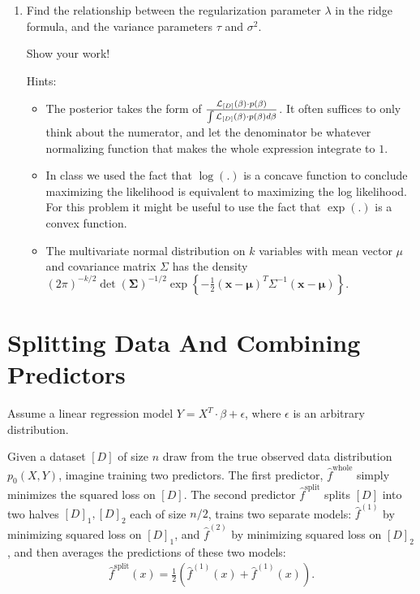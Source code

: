 \documentclass[11pt]{article}
\renewcommand{\vec}[1]{\mathbf{#1}}
\begin{document}
\begin{enumerate}
\begin{answertext}{16cm}{}
\end{answertext} 

\item Find the relationship between the regularization parameter $\lambda$ in the ridge formula, and the variance parameters $\tau$ and $\sigma^2$.

Show your work!

Hints:
\begin{itemize}
\item The posterior takes the form of
$\frac{
{\cal L}_{[D]}(\vec{\beta}) \cdot p(\vec{\beta})
}{
\int {\cal L}_{[D]}(\vec{\beta}) \cdot p(\vec{\beta})
d \vec{\beta}
}$.  It often suffices to only think about the numerator, and let the denominator be whatever normalizing function that makes the whole expression integrate to $1$.
\item In class we used the fact that $\log(.)$ is a concave function to conclude maximizing the likelihood is equivalent to maximizing the log likelihood.  For this problem it might be useful to use the fact that $\exp(.)$ is a convex function.
\item The multivariate normal distribution on $k$ variables with mean vector $\mu$ and covariance matrix $\Sigma$ has the density
$(2 \pi)^{-k/2} \det(\vec{\Sigma})^{-1/2}\exp \left\{ - \frac{1}{2} (\vec{x} - \vec{\mu})^T \Sigma^{-1} (\vec{x} - \vec{\mu})
 \right\}
$.
\end{itemize}

\begin{answertext}{10cm}{}


  
\end{answertext} 

\end{enumerate}

\pagebreak
\section{Splitting Data And Combining Predictors}

Assume a linear regression model $Y = X^T \cdot \beta + \epsilon$, where $\epsilon$ is an arbitrary distribution.

Given a dataset $[D]$ of size $n$ draw from the true observed data distribution $p_0(X, Y)$, imagine training two predictors.
The first predictor, $\hat{f}^{\text{whole}}$ simply minimizes the squared loss on $[D]$.
The second predictor $\hat{f}^{\text{split}}$ splits $[D]$ into two halves $[D]_1, [D]_2$ each of size $n/2$, trains two separate models:  $\hat{f}^{(1)}$ by minimizing squared loss on $[D]_1$, and $\hat{f}^{(2)}$ by minimizing squared loss on $[D]_2$, and then averages the predictions of these two models: 
\begin{align*}
\hat{f}^{\text{split}}(x) = \frac{1}{2} \left( \hat{f}^{(1)}(x) + \hat{f}^{(1)}(x) \right).
\end{align*}
\end{document}
